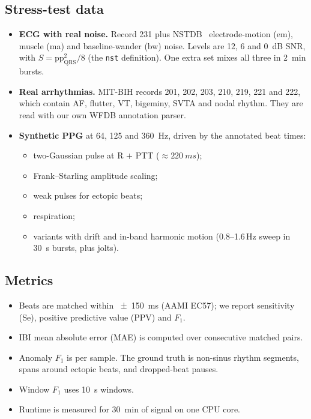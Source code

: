 \documentclass[10pt,a4paper]{article}
\newcommand{\code}[1]{\texttt{#1}}
\begin{document}
\subsection{Stress-test data}
\begin{itemize}
  \item \textbf{ECG with real noise.} Record 231 plus NSTDB~\cite{nstdb} electrode-motion (em), muscle (ma) and
        baseline-wander (bw) noise. Levels are 12, 6 and \SI{0}{dB} SNR, with $S=\mathrm{pp}_{\mathrm{QRS}}^2/8$ (the
        \code{nst} definition). One extra set mixes all three in \SI{2}{min} bursts.
  \item \textbf{Real arrhythmias.} MIT-BIH records 201, 202, 203, 210, 219, 221 and 222, which contain AF, flutter,
        VT, bigeminy, SVTA and nodal rhythm. They are read with our own WFDB annotation parser.
  \item \textbf{Synthetic PPG} at 64, 125 and \SI{360}{Hz}, driven by the annotated beat times:
        \begin{itemize}
          \item two-Gaussian pulse at R $+$ PTT ($\approx\SI{220}{ms}$);
          \item Frank--Starling amplitude scaling;
          \item weak pulses for ectopic beats;
          \item respiration;
          \item variants with drift and in-band harmonic motion (0.8--1.6\,Hz sweep in \SI{30}{s} bursts, plus jolts).
        \end{itemize}
\end{itemize}

\subsection{Metrics}
\begin{itemize}
  \item Beats are matched within \SI{\pm150}{ms} (AAMI EC57); we report sensitivity (Se), positive predictive value
        (PPV) and $F_1$.
  \item IBI mean absolute error (MAE) is computed over consecutive matched pairs.
  \item Anomaly $F_1$ is per sample. The ground truth is non-sinus rhythm segments, spans around ectopic beats, and
        dropped-beat pauses.
  \item Window $F_1$ uses \SI{10}{s} windows.
  \item Runtime is measured for \SI{30}{min} of signal on one CPU core.
\end{itemize}
\end{document}
